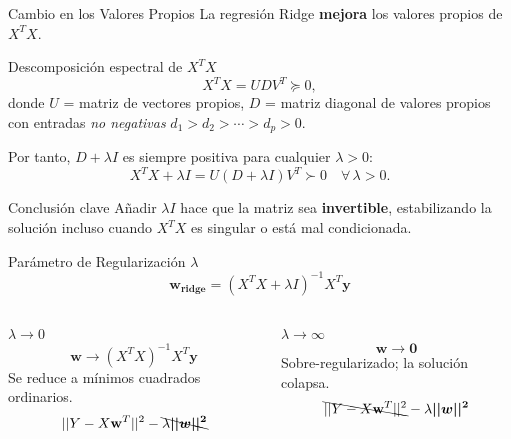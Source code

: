 \documentclass[aspectratio=169, 10pt]{beamer}
\begin{document}
\begin{frame}{Cambio en los Valores Propios}
	La regresión Ridge \textbf{mejora} los valores propios de $X^TX$.
	
	\begin{block}{Descomposición espectral de $X^TX$}
		\[
		X^TX = UDV^T \succeq 0,
		\]
		donde $U$ = matriz de vectores propios, $D$ = matriz diagonal de valores
		propios con entradas \emph{no negativas} $d_1 > d_2 > \cdots > d_p > 0$.
	\end{block}
	
	\bigskip
	Por tanto, $D + \lambda I$ es siempre positiva para cualquier $\lambda > 0$:
	\[
	X^TX + \lambda I = U(D + \lambda I)V^T \succ 0 \quad \forall\,\lambda > 0.
	\]
	\begin{alertblock}{Conclusión clave}
		Añadir $\lambda I$ hace que la matriz sea \textbf{invertible}, estabilizando
		la solución incluso cuando $X^TX$ es singular o está mal condicionada.
	\end{alertblock}
\end{frame}

\begin{frame}{Parámetro de Regularización $\lambda$}
	\[
	\bm{w_{ridge}} = (X^TX + \lambda I)^{-1}X^T\bm{y}
	\]
	\begin{columns}
		\begin{block}{$\lambda \to 0$}
			\[
			\bm{w}\to (X^TX)^{-1}X^T\bm{y}
			\]
			Se reduce a mínimos cuadrados ordinarios.\\
			\[||Y- X\mathbf w^T||^2-  \bcancel{\lambda \bm{||w||^2}}\]
		\end{block}
		
		\begin{block}{$\lambda \to \infty$}
			\[
			\bm{w} \to \bm{0}
			\]
			Sobre-regularizado; la solución colapsa.\\
		\[\bcancel{||Y- X\mathbf w^T||^2}-  \lambda \bm{||w||^2}\]
		\end{block}
	\end{columns}
	
\end{frame}
\end{document}
